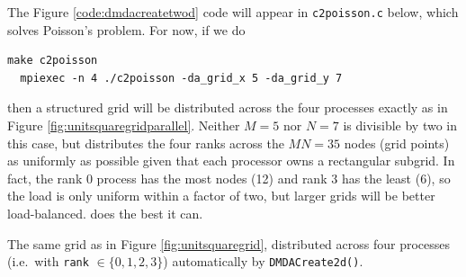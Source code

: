 The Figure \ref{code:dmdacreatetwod} code will appear in \texttt{c2poisson.c} below, which solves Poisson's problem.  For now, if we do
\begin{Verbatim}[fontsize=\small]
  make c2poisson
  mpiexec -n 4 ./c2poisson -da_grid_x 5 -da_grid_y 7
\end{Verbatim}
then a structured grid will be distributed across the four processes exactly as in Figure \ref{fig:unitsquaregridparallel}.  Neither $M=5$ nor $N=7$ is divisible by two in this case, but \PETSc distributes the four ranks across the $MN=35$ nodes (grid points) as uniformly as possible given that each processor owns a rectangular subgrid.  In fact, the rank $0$ process has the most nodes (12) and rank $3$ has the least (6), so the load is only uniform within a factor of two, but larger grids will be better load-balanced.  \PETSc does the best it can.

\begin{marginfigure}
\caption{The same grid as in Figure \ref{fig:unitsquaregrid}, distributed across four \MPI processes (i.e.~with \texttt{rank} $\in \{0,1,2,3\}$) automatically by \texttt{DMDACreate2d()}.}
\label{fig:unitsquaregridparallel}
\end{marginfigure}

